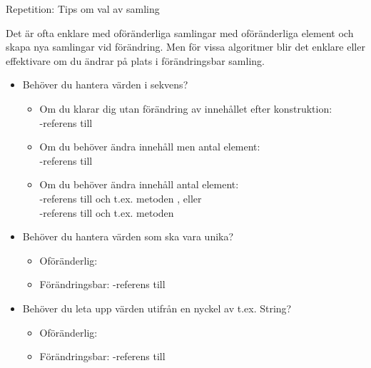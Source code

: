 \begin{Slide}{Repetition: Tips om val av samling}\SlideFontSmall

Det är ofta enklare med oföränderliga samlingar med oföränderliga element och skapa nya samlingar vid förändring. Men för vissa algoritmer blir det enklare eller effektivare om du ändrar på plats i förändringsbar samling.

\begin{itemize}
\item Behöver du hantera värden i sekvens?
\begin{itemize}\SlideFontTiny
\item Om du klarar dig utan förändring av innehållet efter konstruktion:\\
-referens till 
\item Om du behöver ändra innehåll men  antal element:\\
-referens till 
\item Om du behöver ändra innehåll  antal element:
\\ -referens till  och t.ex. metoden , eller \\
-referens till  och t.ex. metoden 
\end{itemize}

\item Behöver du hantera värden  som ska vara unika?
\begin{itemize}\SlideFontTiny
\item Oföränderlig: 
\item Förändringsbar: -referens till 
\end{itemize}

\item Behöver du leta upp värden  utifrån en nyckel av t.ex. String?
\begin{itemize}\SlideFontTiny
\item Oföränderlig: 
\item Förändringsbar: -referens till 
\end{itemize}


\end{itemize}
\end{Slide}


